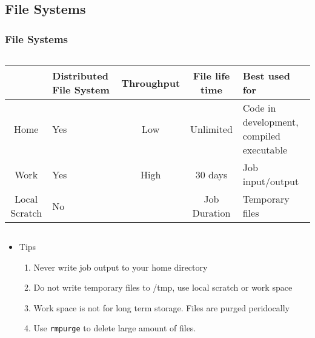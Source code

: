 \documentclass[slidestop,mathserif,compress,xcolor=svgnames,table]{beamer}
\newcommand*\vardiamond{\textcolor{tigerspurple}{%
  \ensuremath{\blacklozenge}}}
\begin{document}
\subsection{File Systems}
\begin{frame}
\frametitle{\small File Systems}
\scriptsize{
\begin{columns}
\column{11cm}
\begin{block}{}
\begin{center}
\begin{tabular}{|c|p{1.5cm}|c|c|p{2.5cm}|}
\hline
& Distributed File System & Throughput & File life time & Best used for \\
\hline
{Home} & Yes & Low & Unlimited & {Code in development, compiled executable}\\ 
\hline
Work & Yes & High & 30 days & Job input/output \\
\hline
{Local Scratch} & No & & Job Duration & Temporary files \\
\hline
\end{tabular}
\end{center}
\end{block}
\end{columns}
}
\begin{itemize}
\item {\footnotesize Tips}
\begin{enumerate}
\item[$\vardiamond$] Never write job output to your home directory
\item[$\vardiamond$] Do not write temporary files to /tmp, use local scratch or work space
\item[$\vardiamond$] Work space is not for long term storage. Files are purged peridocally
\item[$\vardiamond$] Use \texttt{rmpurge} to delete large amount of files.
\end{enumerate}
\end{itemize}
\end{frame}
\end{document}
